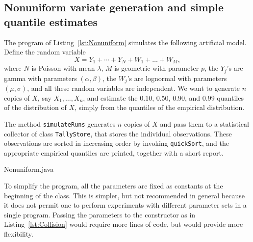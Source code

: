 \subsection {Nonuniform variate generation and simple quantile estimates}
\label {sec:nonuniform}

The program of Listing~\ref{lst:Nonuniform} simulates the following artificial model.
Define the random variable
\[
  X = Y_1 + \cdots + Y_N + W_1 + \dots + W_M,
\]
where $N$ is Poisson with mean $\lambda$, $M$ is geometric with parameter $p$,
the $Y_j$'s are gamma with parameters $(\alpha, \beta)$,
the $W_j$'s are lognormal with parameters $(\mu,\sigma)$,
and all these random variables are independent.
We want to generate $n$ copies of $X$, say $X_1,\dots,X_n$, and estimate
the 0.10, 0.50, 0.90, and 0.99 quantiles of the distribution of $X$,
simply from the quantiles of the empirical distribution.

The method \texttt{simulateRuns} generates $n$ copies of $X$ and pass
them to a statistical collector of class \texttt{TallyStore},
that stores the individual observations. %
These observations are sorted in increasing order by invoking \texttt{quickSort},
and the appropriate empirical quantiles are printed,
together with a short report.



{Nonuniform.java}




To simplify the program, all the parameters are fixed as constants at the
beginning of the class. This is simpler, but not recommended in general
because it does not permit one to perform experiments with different parameter
sets in a single program.
Passing the parameters to the constructor as in Listing~\ref{lst:Collision}
would require more lines of code, but would provide more flexibility.

